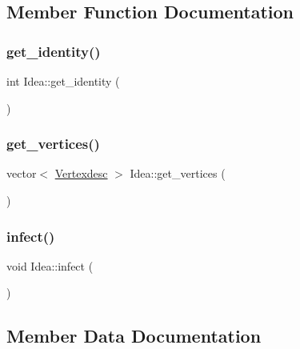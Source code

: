 \subsection{Member Function Documentation}
\mbox{\label{classIdea_ab8b8f7c5025d4514493dd7a759ad1264}} 
\subsubsection{\texorpdfstring{get\+\_\+identity()}{get\_identity()}}
{\footnotesize\ttfamily int Idea\+::get\+\_\+identity (\begin{DoxyParamCaption}{ }\end{DoxyParamCaption})}

\mbox{\label{classIdea_a33d9819c499ec7326fb5b3827a396f5e}} 
\subsubsection{\texorpdfstring{get\+\_\+vertices()}{get\_vertices()}}
{\footnotesize\ttfamily vector$<$ \hyperlink{Networkland_8h_af340ced64bd0b6914662d1b26be70b41}{Vertexdesc} $>$ Idea\+::get\+\_\+vertices (\begin{DoxyParamCaption}{ }\end{DoxyParamCaption})}

\mbox{\label{classIdea_ad0053991270858766ffce283706831fd}} 
\subsubsection{\texorpdfstring{infect()}{infect()}}
{\footnotesize\ttfamily void Idea\+::infect (\begin{DoxyParamCaption}{ }\end{DoxyParamCaption})}



\subsection{Member Data Documentation}
\mbox{\label{classIdea_acb4d46a215bf7cab7ce73394ba178e61}} 
